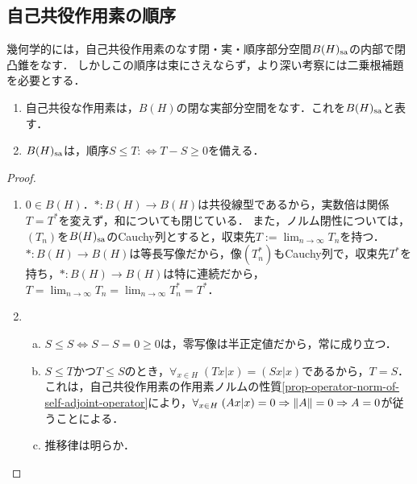 \documentclass[uplatex,dvipdfmx]{jsreport}
\begin{document}
\subsection{自己共役作用素の順序}

\begin{tcolorbox}[colframe=ForestGreen, colback=ForestGreen!10!white,breakable,colbacktitle=ForestGreen!40!white,coltitle=black,fonttitle=\bfseries\sffamily,
title=]
    幾何学的には，自己共役作用素のなす閉・実・順序部分空間$B(H)_{\mathrm{sa}}$の内部で閉凸錐をなす．
    しかしこの順序は束にさえならず，より深い考察には二乗根補題を必要とする．
\end{tcolorbox}

\begin{proposition}\mbox{}
    \begin{enumerate}
        \item 自己共役な作用素は，$B(H)$の閉な実部分空間をなす．これを$B(H)_{\mathrm{sa}}$と表す．
        \item $B(H)_{\mathrm{sa}}$は，順序$S\le T:\Leftrightarrow T-S\ge 0$を備える．
    \end{enumerate}
\end{proposition}
\begin{proof}\mbox{}
    \begin{enumerate}
        \item $0\in B(H)$．$*:B(H)\to B(H)$は共役線型であるから，実数倍は関係$T=T^*$を変えず，和についても閉じている．
        また，ノルム閉性については，$(T_n)$を$B(H)_{\mathrm{sa}}$のCauchy列とすると，収束先$T:=\lim_{n\to\infty}T_n$を持つ．$*:B(H)\to B(H)$は等長写像だから，像$(T_n^*)$もCauchy列で，収束先$T^*$を持ち，$*:B(H)\to B(H)$は特に連続だから，$T=\lim_{n\to\infty}T_n=\lim_{n\to\infty}T_n^*=T^*$．
        \item \begin{enumerate}[(a)]
            \item $S\le S\Leftrightarrow S-S=0\ge 0$は，零写像は半正定値だから，常に成り立つ．
            \item $S\le T$かつ$T\le S$のとき，$\forall_{x\in H}\;(Tx|x)=(Sx|x)$であるから，$T=S$．これは，自己共役作用素の作用素ノルムの性質\ref{prop-operator-norm-of-self-adjoint-operator}により，$\forall_{x\in H}\;(Ax|x)=0\Rightarrow\|A\|=0\Rightarrow A=0$が従うことによる．
            \item 推移律は明らか．
        \end{enumerate}
    \end{enumerate}
\end{proof}
\end{document}

